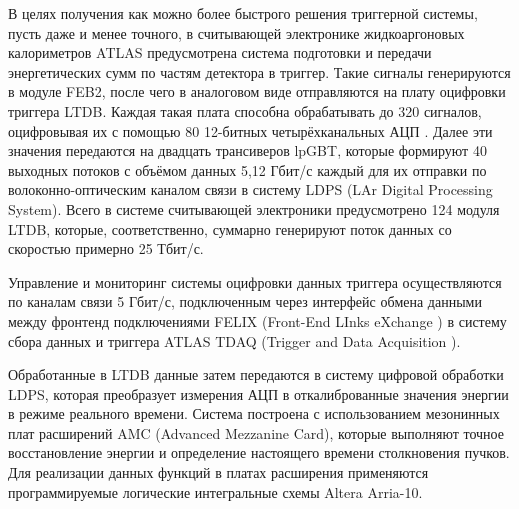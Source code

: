 В целях получения как можно более быстрого решения триггерной системы, пусть даже и менее точного, в считывающей электронике жидкоаргоновых калориметров ATLAS предусмотрена система подготовки и передачи энергетических сумм по частям детектора в триггер. Такие сигналы генерируются в модуле FEB2, после чего в аналоговом виде отправляются на плату оцифровки триггера LTDB. Каждая такая плата способна обрабатывать до 320 сигналов, оцифровывая их с помощью 80 12-битных четырёхканальных АЦП \parencite{ltdb}. Далее эти значения передаются на двадцать трансиверов lpGBT, которые формируют 40 выходных потоков с объёмом данных 5,12 Гбит/с каждый для их отправки по волоконно-оптическим каналом связи в систему LDPS (LAr Digital Processing System). Всего в системе считывающей электроники предусмотрено 124 модуля LTDB, которые, соответственно, суммарно генерируют поток данных со скоростью примерно 25 Тбит/с.\par
Управление и мониторинг системы оцифровки данных триггера осуществляются по каналам связи 5 Гбит/с, подключенным через интерфейс обмена данными между фронтенд подключениями FELIX (Front-End LInks eXchange \parencite{felix}) в систему сбора данных и триггера ATLAS TDAQ (Trigger and Data Acquisition \parencite{tdaq}).\par
Обработанные в LTDB данные затем передаются в систему цифровой обработки LDPS, которая преобразует измерения АЦП в откалиброванные значения энергии в режиме реального времени. Система построена с использованием мезонинных плат расширений AMC (Advanced Mezzanine Card), которые выполняют точное восстановление энергии и определение настоящего времени столкновения пучков. Для реализации данных функций в платах расширения применяются программируемые логические интегральные схемы Altera Arria-10.\par

